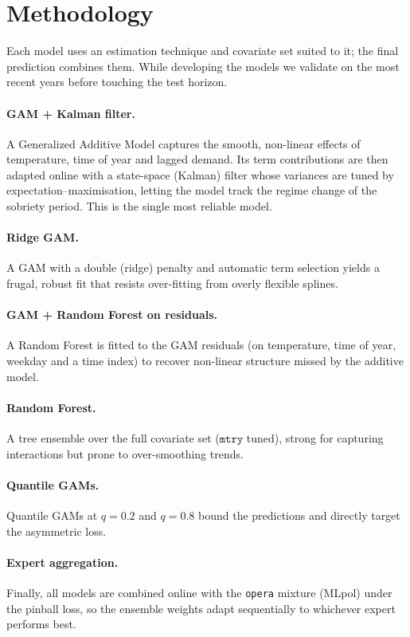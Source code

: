 \documentclass[11pt,a4paper]{article}
\begin{document}
\section{Methodology}
Each model uses an estimation technique and covariate set suited to it; the final
prediction combines them. While developing the models we validate on the most recent
years before touching the test horizon.

\paragraph{GAM + Kalman filter.} A Generalized Additive Model captures the smooth,
non-linear effects of temperature, time of year and lagged demand. Its term
contributions are then adapted online with a state-space (Kalman) filter whose
variances are tuned by expectation--maximisation, letting the model track the regime
change of the sobriety period. This is the single most reliable model.

\paragraph{Ridge GAM.} A GAM with a double (ridge) penalty and automatic term
selection yields a frugal, robust fit that resists over-fitting from overly flexible
splines.

\paragraph{GAM + Random Forest on residuals.} A Random Forest is fitted to the GAM
residuals (on temperature, time of year, weekday and a time index) to recover
non-linear structure missed by the additive model.

\paragraph{Random Forest.} A tree ensemble over the full covariate set ($\texttt{mtry}$
tuned), strong for capturing interactions but prone to over-smoothing trends.

\paragraph{Quantile GAMs.} Quantile GAMs at $q=0.2$ and $q=0.8$ bound the predictions
and directly target the asymmetric loss.

\paragraph{Expert aggregation.} Finally, all models are combined online with the
\texttt{opera} mixture (MLpol) under the pinball loss, so the ensemble weights adapt
sequentially to whichever expert performs best.
\end{document}
